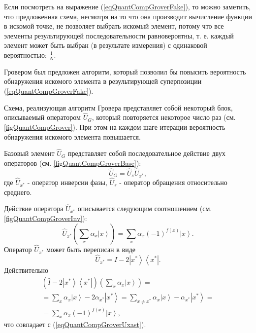 

Если посмотреть на выражение (\ref{eqQuantCompGroverFake}), то можно
заметить, что предложенная схема, несмотря на то что она производит
вычисление функции в искомой точке, не позволяет выбрать искомый
элемент, потому что все элементы результирующей последовательности
равновероятны, т. е. каждый элемент может быть выбран (в результате
измерения) с одинаковой вероятностью: $\frac{1}{N}$.

Гровером был предложен алгоритм, который позволил бы повысить
вероятность обнаружения искомого элемента в результирующей
суперпозиции (\ref{eqQuantCompGroverFake}).





Схема, реализующая алгоритм Гровера представляет собой некоторый блок,
описываемый оператором $\hat{U}_G$, который повторяется некоторое число
раз (см. \autoref{figQuantCompGrover}). При этом на каждом шаге
итерации вероятность обнаружения искомого элемента повышается. 

Базовый элемент $\hat{U}_G$ представляет собой последовательное действие
двух операторов (см. \autoref{figQuantCompGroverBase}):
\begin{equation}
\hat{U}_G=\hat{U}_s\hat{U}_{x^{\ast}},
\nonumber
\end{equation}
где $\hat{U}_{x^{\ast}}$ - оператор инверсии фазы, $\hat{U}_s$
- оператор обращения относительно среднего.



Действие оператора $\hat{U}_{x^{\ast}}$ описывается следующим соотношением
(см. \autoref{figQuantCompGroverInv}):
\begin{equation}
\hat{U}_{x^{\ast}}\left(\sum_x \alpha_x \left|x\right>\right) = 
\sum_x \alpha_x \left(-1\right)^{f\left(x\right)}\left|x\right>.
\label{eqQuantCompGroverUxast}
\end{equation} 
Оператор $\hat{U}_{x^{\ast}}$ может быть переписан в виде
\begin{equation}
\hat{U}_{x^{\ast}} = \hat{I} - 2 \left|x^{\ast}\right>\left<x^{\ast}\right|.
\nonumber
\end{equation} 
Действительно
\begin{eqnarray}
\left(\hat{I} - 2 \left|x^{\ast}\right>\left<x^{\ast}\right|\right)
\left(\sum_x \alpha_x \left|x\right>\right) =
\nonumber \\
= \sum_x \alpha_x \left|x\right> - 2 \alpha_{x^{\ast}}
\left|x^{\ast}\right> = 
\sum_{x\ne x^{\ast}} \alpha_x \left|x\right> -  \alpha_{x^{\ast}}
\left|x^{\ast}\right> =
\nonumber \\
=
\sum_x \alpha_x \left(-1\right)^{f\left(x\right)}\left|x\right>,
\nonumber
\end{eqnarray}
что совпадает с (\ref{eqQuantCompGroverUxast}).

